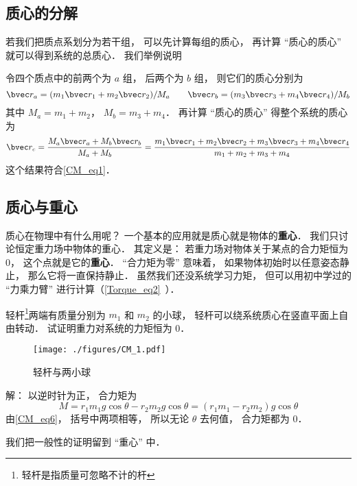 \subsection{质心的分解}
若我们把质点系划分为若干组， 可以先计算每组的质心， 再计算 “质心的质心” 就可以得到系统的总质心． 我们举例说明
\begin{example}{}
令四个质点中的前两个为 $a$ 组， 后两个为 $b$ 组， 则它们的质心分别为
\begin{equation}
\bvec r_a = (m_1 \bvec r_1 + m_2 \bvec r_2)/M_a
\qquad
\bvec r_b = (m_3 \bvec r_3 + m_4 \bvec r_4)/M_b
\end{equation}
其中 $M_a = m_1 + m_2$， $M_b = m_3 + m_4$． 再计算 “质心的质心” 得整个系统的质心为
\begin{equation}
\bvec r_c = \frac{M_a \bvec r_a + M_b \bvec r_b}{M_a + M_b} = \frac{m_1 \bvec r_1 + m_2 \bvec r_2 + m_3 \bvec r_3 + m_4 \bvec r_4}{m_1 + m_2 + m_3 + m_4}
\end{equation}
这个结果符合\autoref{CM_eq1}．
\end{example}

\subsection{质心与重心}
质心在物理中有什么用呢？ 一个基本的应用就是质心就是物体的\textbf{重心}． 我们只讨论恒定重力场中物体的重心． 其定义是： 若重力场对物体关于某点的合力矩恒为 0， 这个点就是它的\textbf{重心}． “合力矩为零” 意味着， 如果物体初始时以任意姿态静止， 那么它将一直保持静止． 虽然我们还没系统学习力矩， 但可以用初中学过的 “力乘力臂” 进行计算（\autoref{Torque_eq2}~）．

\begin{example}{}\label{CM_ex1}
轻杆\footnote{轻杆是指质量可忽略不计的杆}两端有质量分别为 $m_1$ 和 $m_2$ 的小球， 轻杆可以绕系统质心在竖直平面上自由转动． 试证明重力对系统的力矩恒为 0．

\begin{figure}[ht]
\centering
\texttt{[image: ./figures/CM\_1.pdf]}
\caption{轻杆与两小球} \label{CM_fig1}
\end{figure}

解： 以逆时针为正， 合力矩为
\begin{equation}
M = r_1 m_1 g \cos\theta - r_2 m_2 g \cos\theta = (r_1 m_1 - r_2 m_2) g \cos\theta
\end{equation}
由\autoref{CM_eq6}， 括号中两项相等， 所以无论 $\theta$ 去何值， 合力矩都为 0．
\end{example}
我们把一般性的证明留到 “重心” 中．

